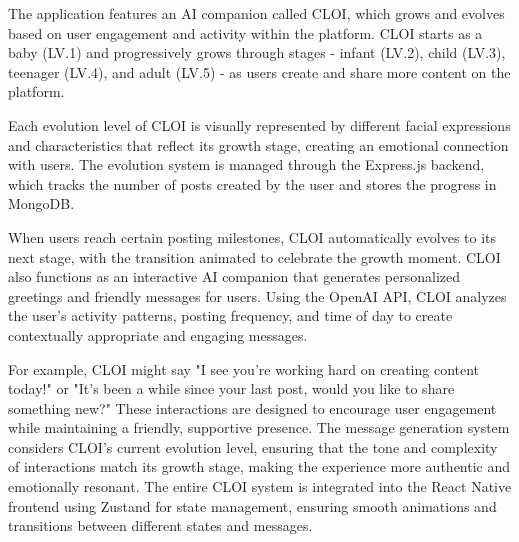 \documentclass[conference]{IEEEtran}
\begin{document}
        The application features an AI companion called CLOI, which grows and evolves based on user engagement and activity within the platform. CLOI starts as a baby (LV.1) and progressively grows through stages - infant (LV.2), child (LV.3), teenager (LV.4), and adult (LV.5) - as users create and share more content on the platform.

        Each evolution level of CLOI is visually represented by different facial expressions and characteristics that reflect its growth stage, creating an emotional connection with users. The evolution system is managed through the Express.js backend, which tracks the number of posts created by the user and stores the progress in MongoDB.

        When users reach certain posting milestones, CLOI automatically evolves to its next stage, with the transition animated to celebrate the growth moment. CLOI also functions as an interactive AI companion that generates personalized greetings and friendly messages for users. Using the OpenAI API, CLOI analyzes the user's activity patterns, posting frequency, and time of day to create contextually appropriate and engaging messages.

        For example, CLOI might say "I see you're working hard on creating content today!" or "It's been a while since your last post, would you like to share something new?" These interactions are designed to encourage user engagement while maintaining a friendly, supportive presence. The message generation system considers CLOI's current evolution level, ensuring that the tone and complexity of interactions match its growth stage, making the experience more authentic and emotionally resonant. The entire CLOI system is integrated into the React Native frontend using Zustand for state management, ensuring smooth animations and transitions between different states and messages.

        
\end{document}
